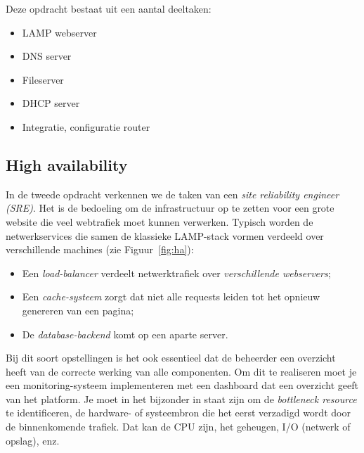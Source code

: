 Deze opdracht bestaat uit een aantal deeltaken:

\begin{itemize}
\item LAMP webserver
\item DNS server
\item Fileserver
\item DHCP server
\item Integratie, configuratie router
\end{itemize}

\subsection{High availability}
\label{subs:high-availability}

In de tweede opdracht verkennen we de taken van een \textit{site reliability engineer (SRE)}. Het is de bedoeling om de infrastructuur op te zetten voor een grote website die veel webtrafiek moet kunnen verwerken. Typisch worden de netwerkservices die samen de klassieke LAMP-stack vormen verdeeld over verschillende machines (zie Figuur~\ref{fig:ha}):

\begin{itemize}
\item Een \textit{load-balancer} verdeelt netwerktrafiek over \textit{verschillende webservers};
\item Een \textit{cache-systeem} zorgt dat niet alle requests leiden tot het opnieuw genereren van een pagina;
\item De \textit{database-backend} komt op een aparte server.
\end{itemize}

Bij dit soort opstellingen is het ook essentieel dat de beheerder een overzicht heeft van de correcte werking van alle componenten. Om dit te realiseren moet je een monitoring-systeem implementeren met een dashboard dat een overzicht geeft van het platform. Je moet in het bijzonder in staat zijn om de \textit{bottleneck resource} te identificeren, de hardware- of systeembron die het eerst verzadigd wordt door de binnenkomende trafiek. Dat kan de CPU zijn, het geheugen, I/O (netwerk of opslag), enz.

